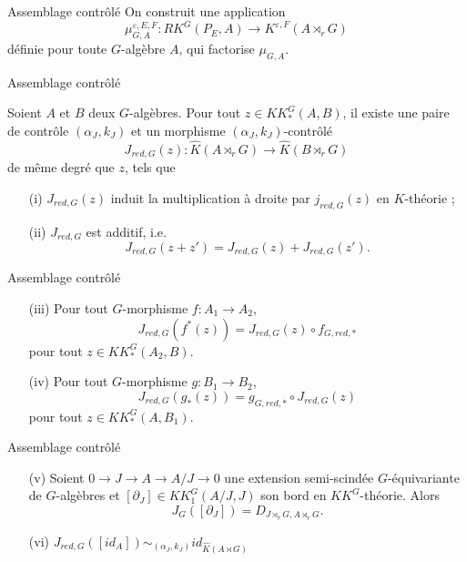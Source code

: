 \begin{frame}{Assemblage contrôlé}
On construit une application 
\[\mu_{G,A}^{\varepsilon, E,F} : RK^G(P_E,A) \rightarrow K^{\varepsilon, F}(A \rtimes_r G)\]
définie pour toute $G$-algèbre $A$, qui factorise $\mu_{G,A}$. %
\end{frame}

\begin{frame}{Assemblage contrôlé}
\begin{propfr}
Soient $A$ et $B$ deux $G$-algèbres. Pour tout $z\in KK^G_*(A,B)$, il existe une paire de contrôle $(\alpha_J,k_J)$ et un morphisme $(\alpha_J,k_J)$-contrôlé
\[J_{red,G}(z) : \hat K(A\rtimes_r G)\rightarrow \hat K(B\rtimes_r G)\]
de même degré que $z$, tels que
\begin{enumerate}
\item[(i)] $J_{red,G}(z)$ induit la multiplication à droite par $j_{red,G}(z)$ en $K$-théorie ;
\item[(ii)] $J_{red,G}$ est additif, i.e.
\[J_{red,G}(z+z')=J_{red,G}(z)+J_{red,G}(z').\]
\end{enumerate}
\end{propfr}
\end{frame}

\begin{frame}{Assemblage contrôlé}
\begin{propfr}[suite]
\begin{enumerate}
\item[(iii)] Pour tout $G$-morphisme $f : A_1\rightarrow A_2$,
\[J_{red,G}(f^*(z))=J_{red,G}(z)\circ f_{G,red,*}\] pour tout $z\in KK_*^G(A_2,B)$.
\item[(iv)] Pour tout $G$-morphisme $g : B_1\rightarrow B_2$,
\[J_{red,G}(g_*(z))= g_{G,red,*}\circ J_{red,G}(z)\] pour tout $z\in KK_*^G(A,B_1)$.
\end{enumerate}
\end{propfr}
\end{frame}

\begin{frame}{Assemblage contrôlé}
\begin{propfr}[suite]
\begin{enumerate}
\item[(v)] Soient $0\rightarrow J\rightarrow A\rightarrow A/J\rightarrow 0$ une extension semi-scindée $G$-équivariante de $G$-algèbres et  $[\partial_J]\in KK_1^G(A/J,J)$ son bord en $KK^G$-théorie. Alors 
\[J_G([\partial_J])=D_{J\rtimes_r G,A\rtimes_rG}.\] 
\item[(vi)] $J_{red,G}([id_A]) \sim_{(\alpha_J,k_J)} id_{\hat K(A\rtimes G)}$
\end{enumerate}
\end{propfr}
\end{frame}

